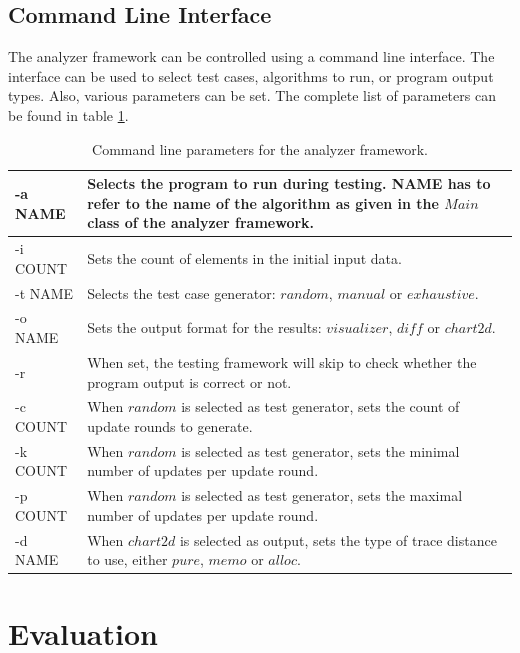 \section{Command Line Interface}

The analyzer framework can be controlled using a command line interface. The interface can be used to select test cases, algorithms to run, or program output types. Also, various parameters can be set. The complete list of parameters can be found in table \ref{tbl:commands}.

\begin{table}[h]
\centering
\begin{tabular}{|l|p{10cm}|}
\hline
-a NAME  & Selects the program to run during testing. NAME has to refer to the name of the algorithm as given in the $Main$ class of the analyzer framework. \\ \hline
-i COUNT & Sets the count of elements in the initial input data.\\ \hline
-t NAME  & Selects the test case generator: $random$, $manual$ or $exhaustive$.\\ \hline
-o NAME  & Sets the output format for the results: $visualizer$, $diff$ or $chart2d$.\\ \hline
-r & When set, the testing framework will skip to check whether the program output is correct or not. \\ \hline
-c COUNT & When $random$ is selected as test generator, sets the count of update rounds to generate. \\ \hline
-k COUNT & When $random$ is selected as test generator, sets the minimal number of updates per update round. \\ \hline
-p COUNT & When $random$ is selected as test generator, sets the maximal number of updates per update round. \\ \hline
-d NAME & When $chart2d$ is selected as output, sets the type of trace distance to use, either $pure$, $memo$ or $alloc$. \\ \hline
\end{tabular}
\caption{Command line parameters for the analyzer framework.}
\label{tbl:commands}
\end{table}

\chapter{Evaluation}
\label{ch:eval}

